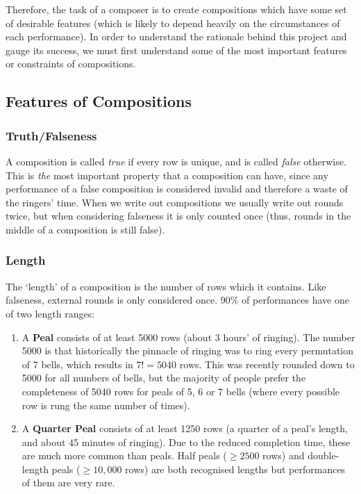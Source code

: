 \documentclass[12pt]{article}
\begin{document}
Therefore, the task of a composer is to create compositions which have some set of desirable
features (which is likely to depend heavily on the circumstances of each performance).  In order to
understand the rationale behind this project and gauge its success, we must first understand some of
the most important features or constraints of compositions.

\subsection{Features of Compositions}

\subsubsection{Truth/Falseness}

A composition is called \emph{true} if every row is unique, and is called \emph{false} otherwise.
This is \emph{the} most important property that a composition can have, since any performance of a
false composition is considered invalid and therefore a waste of the ringers' time.  When we write
out compositions we usually write out rounds twice, but when considering falseness it is only
counted once (thus, rounds in the middle of a composition is still false).

\subsubsection{Length}

The `length' of a composition is the number of rows which it contains.  Like falseness, external
rounds is only considered once.  90\% of performances have one of two length ranges:

\begin{enumerate}
    \item A \textbf{Peal} consists of at least 5000 rows (about 3 hours' of ringing).
        The number 5000 is that historically the pinnacle of ringing was to ring every
        permutation of 7 bells, which results in $7! = 5040$ rows.  This was recently rounded down
        to 5000 for all numbers of bells, but the majority of people prefer the completeness of
        5040 rows for peals of 5, 6 or 7 bells (where every possible row is rung the same number of
        times).
    \item A \textbf{Quarter Peal} consists of at least 1250 rows (a quarter of a peal's length, and
        about 45 minutes of ringing).  Due to the reduced completion time, these are much more
        common than peals.  Half peals ($\ge 2500$ rows) and double-length peals ($\ge 10,000$ rows)
        are both recognised lengths but performances of them are very rare.
\end{enumerate}
\end{document}
